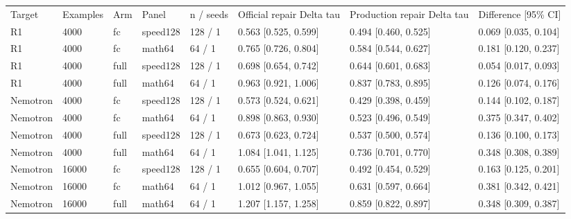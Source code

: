 \begin{tabular}{llllllll}
Target & Examples & Arm & Panel & n / seeds & Official repair Delta tau & Production repair Delta tau & Difference [95\% CI] \\
R1 & 4000 & fc & speed128 & 128 / 1 & 0.563 [0.525, 0.599] & 0.494 [0.460, 0.525] & 0.069 [0.035, 0.104] \\
R1 & 4000 & fc & math64 & 64 / 1 & 0.765 [0.726, 0.804] & 0.584 [0.544, 0.627] & 0.181 [0.120, 0.237] \\
R1 & 4000 & full & speed128 & 128 / 1 & 0.698 [0.654, 0.742] & 0.644 [0.601, 0.683] & 0.054 [0.017, 0.093] \\
R1 & 4000 & full & math64 & 64 / 1 & 0.963 [0.921, 1.006] & 0.837 [0.783, 0.895] & 0.126 [0.074, 0.176] \\
Nemotron & 4000 & fc & speed128 & 128 / 1 & 0.573 [0.524, 0.621] & 0.429 [0.398, 0.459] & 0.144 [0.102, 0.187] \\
Nemotron & 4000 & fc & math64 & 64 / 1 & 0.898 [0.863, 0.930] & 0.523 [0.496, 0.549] & 0.375 [0.347, 0.402] \\
Nemotron & 4000 & full & speed128 & 128 / 1 & 0.673 [0.623, 0.724] & 0.537 [0.500, 0.574] & 0.136 [0.100, 0.173] \\
Nemotron & 4000 & full & math64 & 64 / 1 & 1.084 [1.041, 1.125] & 0.736 [0.701, 0.770] & 0.348 [0.308, 0.389] \\
Nemotron & 16000 & fc & speed128 & 128 / 1 & 0.655 [0.604, 0.707] & 0.492 [0.454, 0.529] & 0.163 [0.125, 0.201] \\
Nemotron & 16000 & fc & math64 & 64 / 1 & 1.012 [0.967, 1.055] & 0.631 [0.597, 0.664] & 0.381 [0.342, 0.421] \\
Nemotron & 16000 & full & math64 & 64 / 1 & 1.207 [1.157, 1.258] & 0.859 [0.822, 0.897] & 0.348 [0.309, 0.387] \\
\end{tabular}
